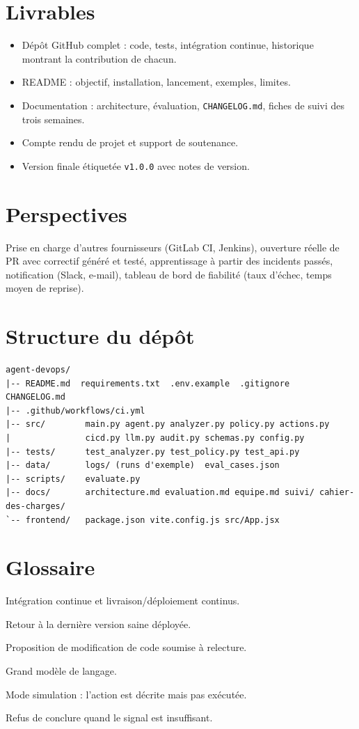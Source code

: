 \documentclass[11pt,a4paper]{article}
\newcommand{\code}[1]{\texttt{#1}}
\begin{document}
\section{Livrables}
\begin{itemize}
\item Dépôt GitHub complet : code, tests, intégration continue, historique montrant la contribution de chacun.
\item README : objectif, installation, lancement, exemples, limites.
\item Documentation : architecture, évaluation, \code{CHANGELOG.md}, fiches de suivi des trois semaines.
\item Compte rendu de projet et support de soutenance.
\item Version finale étiquetée \code{v1.0.0} avec notes de version.
\end{itemize}

\section{Perspectives}
Prise en charge d'autres fournisseurs (GitLab CI, Jenkins), ouverture réelle de PR avec correctif
généré et testé, apprentissage à partir des incidents passés, notification (Slack, e-mail),
tableau de bord de fiabilité (taux d'échec, temps moyen de reprise).

\appendix
\section{Structure du dépôt}
\begin{lstlisting}
agent-devops/
|-- README.md  requirements.txt  .env.example  .gitignore  CHANGELOG.md
|-- .github/workflows/ci.yml
|-- src/        main.py agent.py analyzer.py policy.py actions.py
|               cicd.py llm.py audit.py schemas.py config.py
|-- tests/      test_analyzer.py test_policy.py test_api.py
|-- data/       logs/ (runs d'exemple)  eval_cases.json
|-- scripts/    evaluate.py
|-- docs/       architecture.md evaluation.md equipe.md suivi/ cahier-des-charges/
`-- frontend/   package.json vite.config.js src/App.jsx
\end{lstlisting}

\section{Glossaire}
\begin{description}[leftmargin=3.2cm,style=nextline]
\item[CI/CD] Intégration continue et livraison/déploiement continus.
\item[Rollback] Retour à la dernière version saine déployée.
\item[Pull request] Proposition de modification de code soumise à relecture.
\item[LLM] Grand modèle de langage.
\item[Dry-run] Mode simulation : l'action est décrite mais pas exécutée.
\item[Abstention] Refus de conclure quand le signal est insuffisant.
\end{description}
\end{document}
